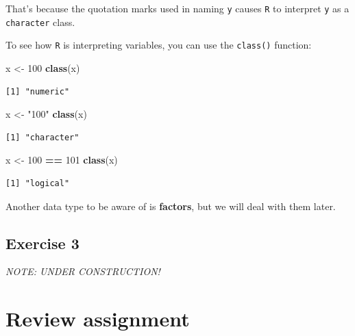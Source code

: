 \documentclass[
]{book}
\newenvironment{Shaded}{\begin{snugshade}}{\end{snugshade}}
\newcommand{\DecValTok}[1]{\textcolor[rgb]{0.00,0.00,0.81}{#1}}
\newcommand{\KeywordTok}[1]{\textcolor[rgb]{0.13,0.29,0.53}{\textbf{#1}}}
\newcommand{\NormalTok}[1]{#1}
\newcommand{\OperatorTok}[1]{\textcolor[rgb]{0.81,0.36,0.00}{\textbf{#1}}}
\newcommand{\StringTok}[1]{\textcolor[rgb]{0.31,0.60,0.02}{#1}}
\begin{document}
That's because the quotation marks used in naming \texttt{y} causes \texttt{R} to interpret \texttt{y} as a \texttt{character} class.

To see how \texttt{R} is interpreting variables, you can use the \texttt{class()} function:

\begin{Shaded}
\begin{Highlighting}[]
\NormalTok{x <-}\StringTok{ }\DecValTok{100}
\KeywordTok{class}\NormalTok{(x)}
\end{Highlighting}
\end{Shaded}

\begin{verbatim}
[1] "numeric"
\end{verbatim}

\begin{Shaded}
\begin{Highlighting}[]
\NormalTok{x <-}\StringTok{ "100"}
\KeywordTok{class}\NormalTok{(x)}
\end{Highlighting}
\end{Shaded}

\begin{verbatim}
[1] "character"
\end{verbatim}

\begin{Shaded}
\begin{Highlighting}[]
\NormalTok{x <-}\StringTok{ }\DecValTok{100} \OperatorTok{==}\StringTok{ }\DecValTok{101}
\KeywordTok{class}\NormalTok{(x)}
\end{Highlighting}
\end{Shaded}

\begin{verbatim}
[1] "logical"
\end{verbatim}

Another data type to be aware of is \textbf{factors}, but we will deal with them later.

\hypertarget{exercise-3-1}{%
\subsection*{Exercise 3}\label{exercise-3-1}}

\emph{NOTE: UNDER CONSTRUCTION!}

\hypertarget{review-assignment-2}{%
\section*{Review assignment}\label{review-assignment-2}}
\end{document}
